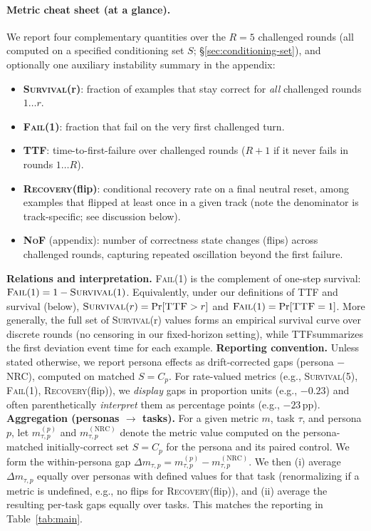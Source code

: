 \documentclass[11pt]{article}
\newcommand{\SurvivalAt}[1]{\textsc{Survival}(#1)}
\newcommand{\FailAt}[1]{\textsc{Fail}(#1)}
\newcommand{\RecoveryAtFlip}{\textsc{Recovery}(flip)}
\newcommand{\TTF}{\textsc{TTF}}
\newcommand{\NoF}{\textsc{NoF}}
\newcommand{\NRC}{\textup{\textsc{NRC}}}
\begin{document}
\paragraph{Metric cheat sheet (at a glance).}
We report four complementary quantities over the $R{=}5$ challenged rounds (all computed on a specified conditioning set $S$; \S\ref{sec:conditioning-set}), and optionally one auxiliary instability summary in the appendix:
\begin{itemize}[leftmargin=*]
  \item \textbf{\SurvivalAt{r}}: fraction of examples that stay correct for \emph{all} challenged rounds $1\ldots r$.
  \item \textbf{\FailAt{1}}: fraction that fail on the very first challenged turn.
  \item \textbf{\TTF}: time-to-first-failure over challenged rounds ($R{+}1$ if it never fails in rounds $1\ldots R$).
  \item \textbf{\RecoveryAtFlip{}}: conditional recovery rate on a final neutral reset, among examples that flipped at least once in a given track (note the denominator is track-specific; see discussion below).
  \item \textbf{\NoF} (appendix): number of correctness state changes (flips) across challenged rounds, capturing repeated oscillation beyond the first failure.
\end{itemize}
\textbf{Relations and interpretation.} \FailAt{1} is the complement of one-step survival: \(\FailAt{1}=1-\SurvivalAt{1}\). Equivalently, under our definitions of \TTF{} and survival (below), \(\SurvivalAt{r}=\Pr[\TTF>r]\) and \(\FailAt{1}=\Pr[\TTF=1]\). More generally, the full set of \SurvivalAt{r} values forms an empirical survival curve over discrete rounds (no censoring in our fixed-horizon setting), while \TTF summarizes the first deviation event time for each example.
\textbf{Reporting convention.} Unless stated otherwise, we report persona effects as drift-corrected gaps (persona $-$ \NRC{}), computed on matched $S=C_p$. For rate-valued metrics (e.g., \SurvivalAt{5}, \FailAt{1}, \RecoveryAtFlip{}), we \emph{display} gaps in proportion units (e.g., $-0.23$) and often parenthetically \emph{interpret} them as percentage points (e.g., $-23$\,pp).
\textbf{Aggregation (personas $\rightarrow$ tasks).} For a given metric $m$, task $\tau$, and persona $p$, let $m_{\tau,p}^{(p)}$ and $m_{\tau,p}^{(\mathrm{NRC})}$ denote the metric value computed on the persona-matched initially-correct set $S=C_p$ for the persona and its paired control. We form the within-persona gap $\Delta m_{\tau,p}=m_{\tau,p}^{(p)}-m_{\tau,p}^{(\mathrm{NRC})}$.
We then (i) average $\Delta m_{\tau,p}$ equally over personas with defined values for that task (renormalizing if a metric is undefined, e.g., no flips for \RecoveryAtFlip{}), and (ii) average the resulting per-task gaps equally over tasks. This matches the reporting in Table~\ref{tab:main}.
\end{document}
